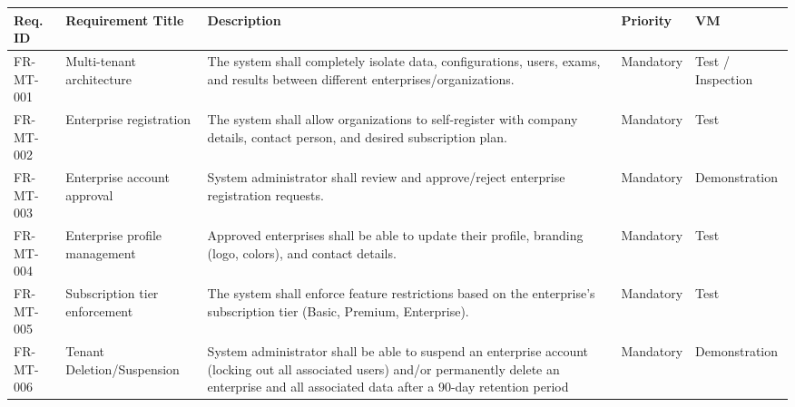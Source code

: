 \singlespacing
\renewcommand{\arraystretch}{1.5}
\setlength{\tabcolsep}{6pt}

\begin{tabularx}{\linewidth}{|l|>{\raggedright\arraybackslash}p{4.5cm}|>{\raggedright\arraybackslash}X|l|l|}
\caption{Enterprise Management and Multi-Tenancy Requirements}
\label{tab:enterprise-mt} \\ \hline
\textbf{Req. ID} & \textbf{Requirement Title} & \textbf{Description} & \textbf{Priority} & \textbf{VM} \\ \hline
FR-MT-001 & Multi-tenant architecture & The system shall completely isolate data, configurations, users, exams, and results between different enterprises/organizations. & Mandatory & Test / Inspection \\ \hline
FR-MT-002 & Enterprise registration & The system shall allow organizations to self-register with company details, contact person, and desired subscription plan. & Mandatory & Test \\ \hline
FR-MT-003 & Enterprise account approval & System administrator shall review and approve/reject enterprise registration requests. & Mandatory & Demonstration \\ \hline
FR-MT-004 & Enterprise profile management & Approved enterprises shall be able to update their profile, branding (logo, colors), and contact details. & Mandatory & Test \\ \hline
FR-MT-005 & Subscription tier enforcement & The system shall enforce feature restrictions based on the enterprise's subscription tier (Basic, Premium, Enterprise). & Mandatory & Test \\ \hline
FR-MT-006 & Tenant Deletion/Suspension & System administrator shall be able to suspend an enterprise account (locking out all associated users) and/or permanently delete an enterprise and all associated data after a 90-day retention period & Mandatory & Demonstration \\ \hline
\end{tabularx}

\vspace{2em}

